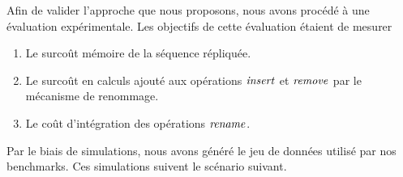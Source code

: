 Afin de valider l'approche que nous proposons, nous avons procédé à une évaluation expérimentale.
Les objectifs de cette évaluation étaient de mesurer
\begin{enumerate}
  \item Le surcoût mémoire de la séquence répliquée.
  \item Le surcoût en calculs ajouté aux opérations $\mathit{insert}$ et $\mathit{remove}$ par le mécanisme de renommage.
  \item Le coût d'intégration des opérations $\mathit{rename}$.
\end{enumerate}

Par le biais de simulations, nous avons généré le jeu de données utilisé par nos benchmarks.
Ces simulations suivent le scénario suivant.
